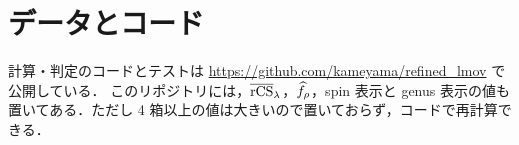 \section{データとコード}\label{app:data}
計算・判定のコードとテストは \url{https://github.com/kameyama/refined_lmov} で公開している．
このリポジトリには，$\overline{\textrm{rCS}}_\lambda$，$\widehat{f}_\rho$，spin 表示と genus 表示の値も置いてある．ただし 4 箱以上の値は大きいので置いておらず，コードで再計算できる．
